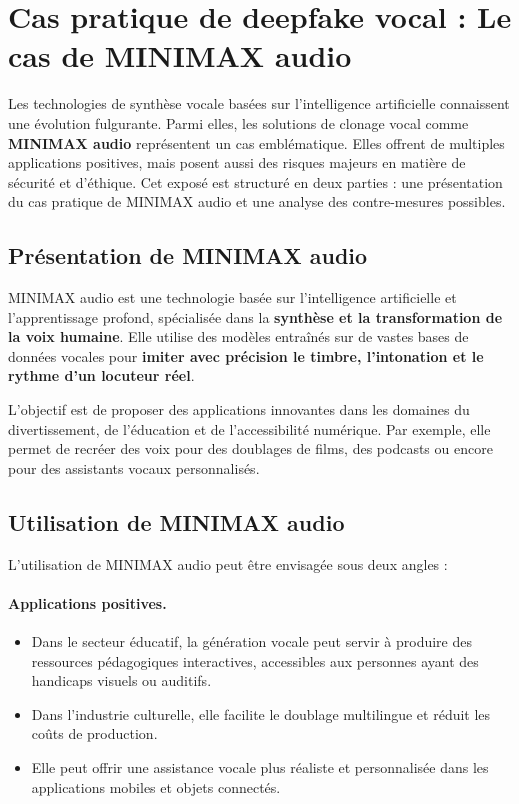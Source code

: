 \documentclass[memoire, 12pt]{report}
\begin{document}
\section{Cas pratique de deepfake vocal : Le cas de MINIMAX audio}

Les technologies de synthèse vocale basées sur l’intelligence artificielle connaissent une évolution fulgurante. 
Parmi elles, les solutions de clonage vocal comme \textbf{MINIMAX audio} représentent un cas emblématique. 
Elles offrent de multiples applications positives, mais posent aussi des risques majeurs en matière de sécurité et d’éthique. 
Cet exposé est structuré en deux parties : une présentation du cas pratique de MINIMAX audio et une analyse des contre-mesures possibles.

\subsection{Présentation de MINIMAX audio}
MINIMAX audio est une technologie basée sur l’intelligence artificielle et l’apprentissage profond, spécialisée dans la 
\textbf{synthèse et la transformation de la voix humaine}. 
Elle utilise des modèles entraînés sur de vastes bases de données vocales pour \textbf{imiter avec précision le timbre, l’intonation et le rythme d’un locuteur réel}.  

L’objectif est de proposer des applications innovantes dans les domaines du divertissement, de l’éducation et de l’accessibilité numérique. 
Par exemple, elle permet de recréer des voix pour des doublages de films, des podcasts ou encore pour des assistants vocaux personnalisés.

\subsection{Utilisation de MINIMAX audio}
L’utilisation de MINIMAX audio peut être envisagée sous deux angles :  

\paragraph{Applications positives.}
\begin{itemize}
    \item Dans le secteur éducatif, la génération vocale peut servir à produire des ressources pédagogiques interactives, accessibles aux personnes ayant des handicaps visuels ou auditifs.
    \item Dans l’industrie culturelle, elle facilite le doublage multilingue et réduit les coûts de production.
    \item Elle peut offrir une assistance vocale plus réaliste et personnalisée dans les applications mobiles et objets connectés.
\end{itemize}
\end{document}

